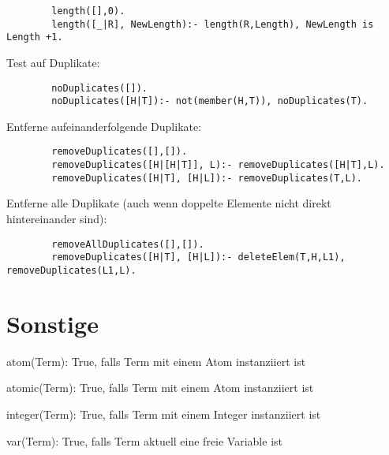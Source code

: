 \begin{compactitem}
		\begin{lstlisting}
		length([],0).
		length([_|R], NewLength):- length(R,Length), NewLength is Length +1.
		\end{lstlisting}
	\item Test auf Duplikate:
		\begin{lstlisting}
		noDuplicates([]).
		noDuplicates([H|T]):- not(member(H,T)), noDuplicates(T).
		\end{lstlisting}
	\item Entferne aufeinanderfolgende Duplikate:
		\begin{lstlisting}
		removeDuplicates([],[]).
		removeDuplicates([H|[H|T]], L):- removeDuplicates([H|T],L).
		removeDuplicates([H|T], [H|L]):- removeDuplicates(T,L).
		\end{lstlisting}
	\item Entferne alle Duplikate (auch wenn doppelte Elemente nicht direkt hintereinander sind):
		\begin{lstlisting}
		removeAllDuplicates([],[]).
		removeDuplicates([H|T], [H|L]):- deleteElem(T,H,L1), removeDuplicates(L1,L).
		\end{lstlisting}
\end{compactitem}

\section{Sonstige}
\begin{compactitem}
	\item atom(Term): True, falls Term mit einem Atom instanziiert ist 
	\item atomic(Term): True, falls Term mit einem Atom instanziiert ist 
	\item integer(Term): True, falls Term mit einem Integer instanziiert ist
	\item var(Term): True, falls Term aktuell eine freie Variable ist
\end{compactitem}